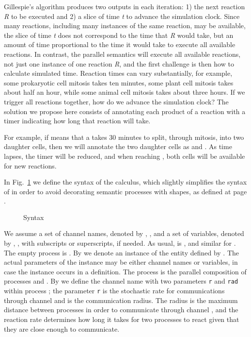 \documentclass[submission,
copyright,
creativecommons
]{eptcs}
\begin{document}
Gillespie's algorithm produces two outputs in each iteration: 1) the
next reaction \textit R to be executed and 2) a slice of time \textit
t to advance the simulation clock. Since many reactions, including
many instances of the same reaction, may be available, the slice of
time \textit t does not correspond to the time that \textit R would
take, but an amount of time proportional to the time it would take to
execute all available reactions. In contrast, the parallel semantics
will execute all available reactions, not just one instance of one
reaction \textit R, and the first challenge is then how to calculate simulated
time.
Reaction times can vary substantially, for example, some
prokaryotic cell mitosis takes ten minutes, some plant cell mitosis
takes about half an hour, while some animal cell mitosis takes about
three hours.
If we trigger all reactions together, how do we advance the
simulation clock?  The solution we propose here consists of annotating
each product of a reaction with a timer indicating how long that
reaction will take.

For example, if  means that a
 takes 30 minutes to split, through mitosis, into two daughter cells, then we will
annotate the two daughter cells as  and
.
As time lapses, the timer will be reduced, and when reaching ,
both cells will be available for new reactions.


In Fig.~\ref{fig.syntax} we define the syntax of the calculus, which
slightly simplifies the syntax of \cite{BioScape:CS2Bio} in order to
avoid  decorating semantic  processes with shapes, as defined at page \pageref{shape}.


\begin{figure}[t]
\vspace*{-0.8cm}
 {\small  }
\vspace*{-0.6cm}
\caption{Syntax}
 \label{fig.syntax}
\vspace*{-0.5cm}
\end{figure}

We assume a set of channel names, denoted by
, , and a set of variables, denoted by ,
, with subscripts or superscripts, if needed. As usual,
 is , and similar for
.
The empty process is .
By  we denote an instance of the entity defined by .
The actual parameters of the instance may be either channel names or variables,
in case the instance occurs in a definition.
The process  is the parallel composition
of processes  and  .
 By
 we
define the channel name  with two parameters \texttt{r} and
\texttt{rad} within process ; the parameter \texttt{r} is the stochastic
rate for communications through channel  and  is the
communication radius. The radius is the maximum distance between
processes in order to communicate through channel , and the
reaction rate determines how long it takes for two processes to react given that they are close enough
to communicate.
\end{document}
